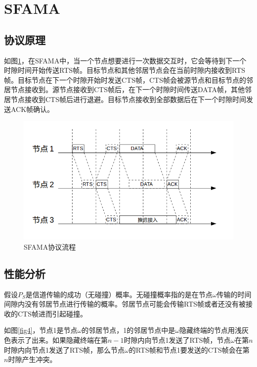 \section{SFAMA}
\subsection{协议原理}
如图\ref{fig3}，在SFAMA\cite{molins2007slotted}中，当一个节点想要进行一次数据交互时，它会等待到下一个时隙时间开始传送RTS帧。目标节点和其他邻居节点会在当前时隙内接收到RTS帧。目标节点在下一个时隙开始时发送CTS帧，CTS帧会被源节点和目标节点的邻居节点接收到。源节点接收到CTS帧后，在下一个时隙时间传送DATA帧，其他邻居节点接收到CTS帧后进行退避。目标节点接收到全部数据后在下一个时隙时间发送ACK帧确认。

\begin{figure}[ht]
	\centering
	\includegraphics[scale=0.4]{figures/sf.png}
	\caption{
		SFAMA协议流程
	}
	\label{fig3}
\end{figure}

\subsection{性能分析}
假设$P_S$是信道传输的成功（无碰撞）概率。无碰撞概率指的是在节点$\omega$传输的时间间隙内没有邻居节点进行传输的概率。邻居节点可能会传输RTS帧或者还没有被接收的CTS帧进而引起碰撞。

如图\ref{fig4}，节点1是节点$\omega$的邻居节点，1的邻居节点中是$\omega$隐藏终端的节点用浅灰色表示了出来。如果隐藏终端在第$n-1$时隙内向节点1发送了RTS帧，节点$\omega$在第$n$时隙内向节点1发送了RTS帧，那么节点$\omega$的RTS帧和节点1要发送的CTS帧会在第$n$时隙产生冲突。

